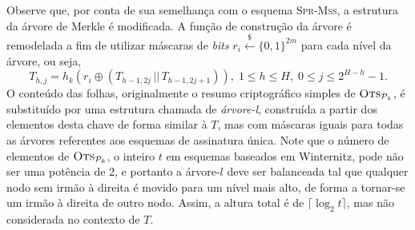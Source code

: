 \documentclass[12pt,notitlepage]{report}
\newcommand{\pk}{\mathcal{P}_k}
\newcommand{\concat}{\, \vert \vert \,}
\newcommand{\binwds}[1]{\{0, 1\}^{#1}}
\newcommand{\sprmss}{\textsc{Spr-Mss}}
\begin{document}
Observe que, por conta de sua semelhança com o esquema \sprmss{}, a estrutura da árvore de Merkle é modificada. A função de construção da árvore é remodelada a fim de utilizar máscaras de \emph{bits} $r_i \stackrel{\$}{\longleftarrow} \binwds{2m}$ para cada nível da árvore, ou seja,
\begin{equation}
    T_{h, j} = h_k(r_i \oplus (T_{h - 1, 2j} \concat T_{h - 1, 2j + 1})),
      \; 1 \leq h \leq H, \; 0 \leq j \leq 2^{H - h} - 1.
\end{equation}
O conteúdo das folhas, originalmente o resumo criptográfico simples de $\textsc{Ots}_{\pk{}}$, é substituído por uma estrutura chamada de \emph{árvore-l}, construída a partir dos elementos desta chave de forma similar à $T$, mas com máscaras iguais para todas as árvores referentes aos esquemas de assinatura única. Note que o número de elementos de $\textsc{Ots}_{\pk{}}$, o inteiro $t$ em esquemas baseados em Winternitz, pode não ser uma potência de 2, e portanto a árvore-$l$ deve ser balanceada tal que qualquer nodo sem irmão à direita é movido para um nível mais alto, de forma a tornar-se um irmão à direita de outro nodo. Assim, a altura total é de $\lceil \log_{2} t \rceil$, mas não considerada no contexto de $T$.
\end{document}
